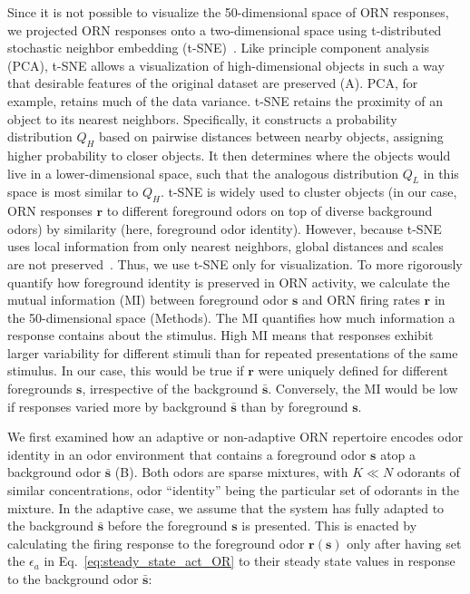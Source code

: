 \documentclass[9pt,lineno]{elife}
\begin{document}
Since it is not possible to visualize the 50-dimensional space of ORN responses, we projected ORN responses onto a two-dimensional space using t-distributed stochastic neighbor embedding (t-SNE)~\citep{tsne}. Like principle component analysis (PCA), t-SNE allows a visualization of high-dimensional objects in such a way that desirable features of the original dataset are preserved  (A). PCA, for example, retains much of the data variance. t-SNE retains the proximity of an object to its nearest neighbors. Specifically, it constructs a probability distribution $Q_H$ based on pairwise distances between nearby objects, assigning higher probability to closer objects. It then determines where the objects would live in a lower-dimensional space, such that the analogous distribution $Q_L$ in this space is most similar to $Q_H$. t-SNE is widely used to cluster objects (in our case, ORN responses $\mathbf r$ to different foreground odors on top of diverse background odors) by similarity (here, foreground odor identity). However, because t-SNE uses local information from only nearest neighbors, global distances and scales are not preserved~\citep{globaltsne}. Thus, we use t-SNE only for visualization. To more rigorously quantify how foreground identity is preserved in ORN activity, we calculate the mutual information (MI) between foreground odor $\mathbf{s}$ and ORN firing rates $\mathbf r$ in the 50-dimensional space (Methods). The MI quantifies how much information a response contains about the stimulus. High MI means that responses exhibit larger variability for different stimuli than for repeated presentations of the same stimulus. In our case, this would be true if $\mathbf r$ were uniquely defined for different foregrounds $\mathbf s$, irrespective of the background $\bar{\mathbf{s}}$. Conversely, the MI would be low if responses varied more by background $\bar{\mathbf{s}}$ than by foreground $\mathbf s$.

We first examined how an adaptive or non-adaptive ORN repertoire encodes odor identity in an odor environment that contains a foreground odor $\mathbf{s}$ atop a background odor $\bar{\mathbf{s}}$ (B). Both odors are sparse mixtures, with $K \ll N$ odorants of similar concentrations, odor ``identity'' being the particular set of odorants in the mixture. In the adaptive case, we assume that the system has fully adapted to the background $\bar{\mathbf{s}}$ before the foreground $\mathbf{s}$ is presented. This is enacted by calculating the firing response to the foreground odor $\mathbf{r}(\mathbf{s})$ only after having set the $\epsilon_a$ in Eq.~\ref{eq:steady_state_act_OR} to their steady state values in response to the background odor $\bar{\mathbf{s}}$: 
\end{document}
